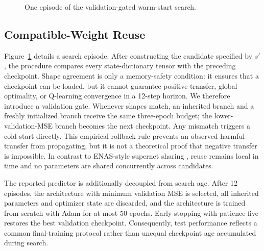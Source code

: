 \documentclass[conference]{IEEEtran}
\begin{document}
\begin{figure}[t]
\centering
{}
\caption{One episode of the validation-gated warm-start search.}
\label{fig:pipeline}
\end{figure}

\subsection{Compatible-Weight Reuse}
Figure~\ref{fig:pipeline} details a search episode. After constructing the candidate specified by $s'$, the procedure compares every state-dictionary tensor with the preceding checkpoint. Shape agreement is only a memory-safety condition: it ensures that a checkpoint can be loaded, but it cannot guarantee positive transfer, global optimality, or Q-learning convergence in a 12-step horizon. We therefore introduce a validation gate. Whenever shapes match, an inherited branch and a freshly initialized branch receive the same three-epoch budget; the lower-validation-MSE branch becomes the next checkpoint. Any mismatch triggers a cold start directly. This empirical rollback rule prevents an observed harmful transfer from propagating, but it is not a theoretical proof that negative transfer is impossible. In contrast to ENAS-style supernet sharing \cite{pham2018enas}, reuse remains local in time and no parameters are shared concurrently across candidates.

The reported predictor is additionally decoupled from search age. After 12 episodes, the architecture with minimum validation MSE is selected, all inherited parameters and optimizer state are discarded, and the architecture is trained from scratch with Adam for at most 50 epochs. Early stopping with patience five restores the best validation checkpoint. Consequently, test performance reflects a common final-training protocol rather than unequal checkpoint age accumulated during search.
\end{document}
